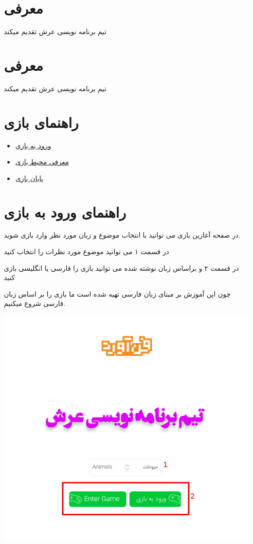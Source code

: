 \documentclass[]{article}
\date{}
\providecommand{\tightlist}{%
  \setlength{\itemsep}{0pt}\setlength{\parskip}{0pt}}
\begin{document}
\section{معرفی}\label{ux645ux639ux631ux641ux6cc}

تیم برنامه نویسی عرش تقدیم میکند

\section{معرفی}\label{ux645ux639ux631ux641ux6cc-1}

تیم برنامه نویسی عرش تقدیم میکند

\section{راهنمای
بازی}\label{ux631ux627ux647ux646ux645ux627ux6cc-ux628ux627ux632ux6cc}

\begin{itemize}
\tightlist
\item
  \href{entergame.md}{ورود به بازی}
\item
  \href{enviroment.md}{معرفی محیط بازی}
\item
  \href{endgame.md}{پایان بازی}
\end{itemize}

\section{راهنمای ورود به
بازی}\label{ux631ux627ux647ux646ux645ux627ux6cc-ux648ux631ux648ux62f-ux628ux647-ux628ux627ux632ux6cc}

در صفحه آغازین بازی می توانید با انتخاب موضوع و زبان مورد نظر وارد بازی
شوید.

در قسمت ۱ می توانید موضوع مورد نظرات را انتخاب کنید

در قسمت ۲ و براساس زبان نوشته شده می توانید بازی را فارسی یا انگلیسی
بازی کنید

چون این آموزش بر مبنای زبان فارسی تهیه شده است ما بازی را بر اساس زبان
فارسی شروع میکنیم.

\includegraphics{../images/entergame.png}
\end{document}
